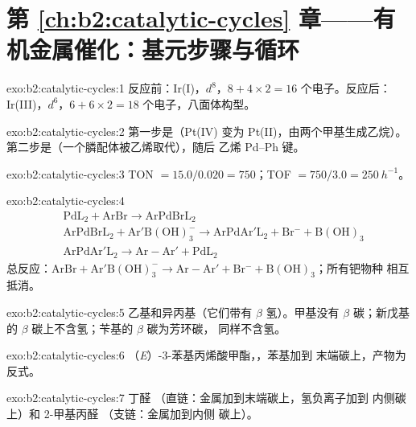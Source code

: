 \section*{第 \ref{ch:b2:catalytic-cycles} 章——有机金属催化：基元步骤与循环}

\begin{solution}{exo:b2:catalytic-cycles:1}
反应前：Ir(I)，$d^8$，$8 + 4 \times 2 = 16$ 个电子。反应后：Ir(III)，$d^6$，$6 + 6 \times 2 = 18$
个电子，八面体构型。
\end{solution}

\begin{solution}{exo:b2:catalytic-cycles:2}
第一步是（Pt(IV) 变为 Pt(II)，由两个甲基生成乙烷）。
第二步是（一个膦配体被乙烯取代），随后
乙烯 Pd--Ph 键。
\end{solution}

\begin{solution}{exo:b2:catalytic-cycles:3}
TON $= 15.0/0.020 = 750$；TOF $= 750/3.0 = \qty{250}{h^{-1}}$。
\end{solution}

\begin{solution}{exo:b2:catalytic-cycles:4}
\begin{align*}
  &\mathrm{PdL_2 + ArBr \to ArPdBrL_2}\\
  &\mathrm{ArPdBrL_2 + Ar'B(OH)_3^- \to ArPdAr'L_2 + Br^- + B(OH)_3}\\
  &\mathrm{ArPdAr'L_2 \to Ar{-}Ar' + PdL_2}
\end{align*}
总反应：$\mathrm{ArBr + Ar'B(OH)_3^- \to Ar{-}Ar' + Br^- + B(OH)_3}$；所有钯物种
相互抵消。
\end{solution}

\begin{solution}{exo:b2:catalytic-cycles:5}
乙基和异丙基（它们带有 $\beta$ 氢）。甲基没有 $\beta$ 碳；新戊基的 $\beta$
碳上不含氢；苄基的 $\beta$ 碳为芳环碳，
同样不含氢。
\end{solution}

\begin{solution}{exo:b2:catalytic-cycles:6}
（\textit{E}）-3-苯基丙烯酸甲酯，，苯基加到
末端碳上，产物为反式。
\end{solution}

\begin{solution}{exo:b2:catalytic-cycles:7}
丁醛 （直链：金属加到末端碳上，氢负离子加到
内侧碳上）和 2-甲基丙醛 （支链：金属加到内侧
碳上）。
\end{solution}

